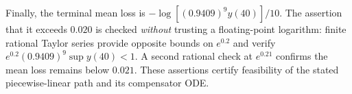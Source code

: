 \documentclass[review,hidelinks,onefignum,onetabnum]{siamonline250211}
\begin{document}
Finally, the terminal mean loss is $-\log[(0.9409)^9 y(40)]/10$. The assertion that it exceeds $0.020$ is checked \emph{without} trusting a floating-point logarithm: finite rational Taylor series provide opposite bounds on $e^{0.2}$ and verify $e^{0.2}(0.9409)^9\sup y(40)<1$. A second rational check at $e^{0.21}$ confirms the mean loss remains below $0.021$. These assertions certify feasibility of the stated piecewise-linear path and its compensator ODE.



\end{document}
